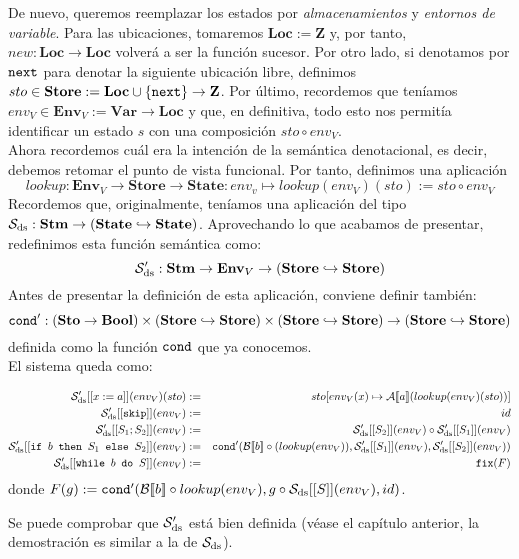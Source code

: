 De nuevo, queremos reemplazar los estados por \textit{almacenamientos} y \textit{entornos de variable}. Para las ubicaciones, tomaremos $\mathbf{Loc} := \mathbf{Z}$ y, por tanto, $new: \mathbf{Loc}\to \mathbf{Loc}$ volverá a ser la función sucesor. Por otro lado, si denotamos por $\texttt{next}$ para denotar la siguiente ubicación libre, definimos $sto \in \mathbf{Store}:= \mathbf{Loc}\cup\{\texttt{next}\}\to \mathbf{Z}$. Por último, recordemos que teníamos $env_V \in \mathbf{Env}_V := \mathbf{Var}\to \mathbf{Loc}$ y que, en definitiva, todo esto nos permitía identificar un estado $s$ con una composición $sto \circ env_V$.
\\

Ahora recordemos cuál era la intención de la semántica denotacional, es decir, debemos retomar el punto de vista funcional. Por tanto, definimos una aplicación
$$lookup : \mathbf{Env}_V \to \mathbf{Store}\to \mathbf{State}: env_v \mapsto lookup(env_V)(sto) := sto \circ env_V$$
Recordemos que, originalmente, teníamos una aplicación del tipo $\mathcal{S}_{\mathrm{ds}} : \mathbf{Stm} \to (\textbf{State} \hookrightarrow \textbf{State})$. Aprovechando lo que acabamos de presentar, redefinimos esta función semántica como:
$$\mathcal{S}'_{\mathrm{ds}}: \mathbf{Stm}\to \mathbf{Env}_V \to (\mathbf{Store}\hookrightarrow \mathbf{Store})$$
Antes de presentar la definición de esta aplicación, conviene definir también:
$$\texttt{cond}': (\mathbf{Sto}\to \mathbf{Bool})\times (\mathbf{Store}\hookrightarrow \mathbf{Store}) \times (\mathbf{Store}\hookrightarrow \mathbf{Store}) \to (\mathbf{Store}\hookrightarrow \mathbf{Store})$$
definida como la función $\texttt{cond}$ que ya conocemos.
\\

El sistema queda como:
\begin{sist*}
\begin{eqnarray*}
    \mathcal{S}'_{\mathrm{ds}} [[x:=a]](env_V)(sto) &:=& sto[env_V(x)\mapsto \mathcal{A}[\![a]\!](lookup(env_V)(sto))] \\
    \mathcal{S}'_{\mathrm{ds}} [[\texttt{skip}]](env_V) &:=& id \\
    \mathcal{S}'_{\mathrm{ds}} [[S_1;S_2]](env_V) &:=& \mathcal{S}'_{\mathrm{ds}} [[S_2]](env_V) \circ \mathcal{S}'_{\mathrm{ds}} [[S_1]](env_V) \\
    \mathcal{S}'_{\mathrm{ds}} [[\texttt{if } b\texttt{ then } S_1\texttt{ else } S_2]](env_V) &:=&  \texttt{cond}'(\mathcal{B}[\![b]\!]\circ (lookup(env_V)), \mathcal{S}'_{\mathrm{ds}} [[S_1]](env_V), \mathcal{S}'_{\mathrm{ds}} [[S_2]](env_V))\\
    \mathcal{S}'_{\mathrm{ds}} [[\texttt{while } b \texttt{ do } S]](env_V) &:=&  \texttt{fix}(F)
\end{eqnarray*}
donde $F(g) := \texttt{cond}'(\mathcal{B}[\![b]\!]\circ lookup(env_V), g\circ \mathcal{S}_{\mathrm{ds}}[[S]](env_V), id)$.
\end{sist*}
Se puede comprobar que $\mathcal{S}'_{\mathrm{ds}}$ está bien definida (véase el capítulo anterior, la demostración es similar a la de $\mathcal{S}_{\mathrm{ds}}$).  

